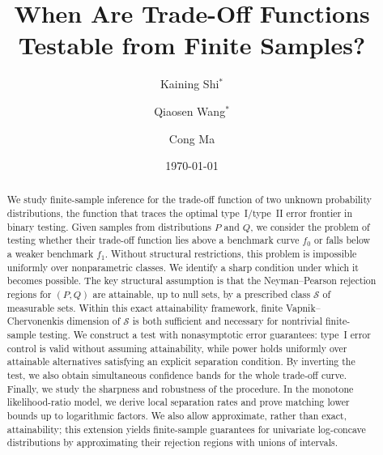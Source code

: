 \documentclass[english]{article}
\theoremstyle{plain}
\theoremstyle{definition}
\begin{document}
\allowdisplaybreaks


\title{When Are Trade-Off Functions Testable from Finite Samples?}

\author{Kaining Shi$^{*}$}
\author{Qiaosen Wang$^{*}$}
\author{Cong Ma}


\date{\today}


\maketitle


\begingroup
\renewcommand{\thefootnote}{\fnsymbol{footnote}}
\setcounter{footnote}{1}
\addtocounter{footnote}{-1}
\endgroup


\begin{abstract}
We study finite-sample inference for the trade-off function of two unknown
probability distributions, the function that traces the optimal type~I/type~II
error frontier in binary testing. 
Given samples from distributions \(P\) and
\(Q\), we consider the problem of testing whether their trade-off function lies above a
benchmark curve \(f_0\) or falls below a weaker benchmark \(f_1\). 
Without
structural restrictions, this problem is impossible uniformly over nonparametric classes. We identify a sharp condition under which it becomes
possible. The key structural assumption is that the Neyman--Pearson rejection
regions for \((P,Q)\) are attainable, up to null sets, by a prescribed class
\(\mathcal S\) of measurable sets. Within this exact attainability framework,
finite Vapnik--Chervonenkis dimension of \(\mathcal S\) is both sufficient and
necessary for nontrivial finite-sample testing. We construct a test with
nonasymptotic error guarantees: type~I error control is valid without assuming
attainability, while power holds uniformly over attainable alternatives
satisfying an explicit separation condition.  
By inverting the test, we also obtain simultaneous confidence
bands for the whole trade-off curve. Finally, we study the sharpness and
robustness of the procedure. In the monotone likelihood-ratio model, we derive
local separation rates and prove matching lower bounds up to logarithmic
factors. We also allow approximate, rather than exact, attainability; this
extension yields finite-sample guarantees for univariate log-concave
distributions by approximating their rejection regions with unions of
intervals.
\end{abstract}
\end{document}
